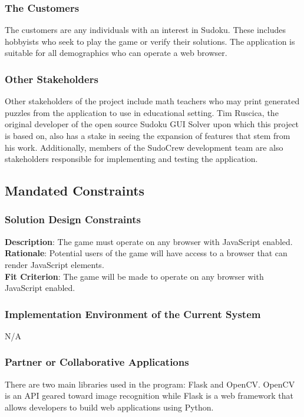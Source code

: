 \documentclass[11pt]{article}
\begin{document}
\subsubsection{The Customers}
The customers are any individuals with an interest in Sudoku. These includes hobbyists who seek to play the game or verify their solutions. The application is suitable for all demographics who can operate a web browser.

\subsubsection{Other Stakeholders}
Other stakeholders of the project include math teachers who may print generated puzzles from the application to use in educational setting. Tim Ruscica, the original developer of the open source Sudoku GUI Solver upon which this project is based on, also has a stake in seeing the expansion of features that stem from his work. Additionally, members of the SudoCrew development team are also stakeholders responsible for implementing and testing the application.

\subsection{Mandated Constraints}
\subsubsection{Solution Design Constraints}
\textbf{Description}: The game must operate on any browser with JavaScript enabled.
\\
\textbf{Rationale}: Potential users of the game will have access to a browser that can render JavaScript elements.
\\
\textbf{Fit Criterion}: The game will be made to operate on any browser with JavaScript enabled.

\subsubsection{Implementation Environment of the Current System}
N/A

\subsubsection{Partner or Collaborative Applications}
There are two main libraries used in the program: Flask and OpenCV. OpenCV is an API geared toward image recognition while Flask is a web framework that allows developers to build web applications using Python.
\end{document}
